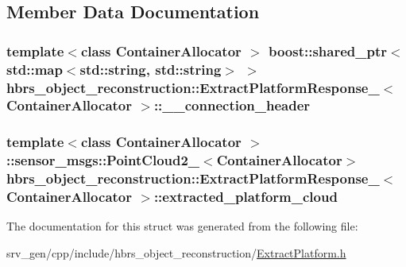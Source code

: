\subsection{\-Member \-Data \-Documentation}
\hypertarget{structhbrs__object__reconstruction_1_1_extract_platform_response___a2f07573bdee38c36a10d7880923dc5f6}{
\subsubsection[{\-\_\-\-\_\-connection\-\_\-header}]{\setlength{\rightskip}{0pt plus 5cm}template$<$class Container\-Allocator $>$ boost\-::shared\-\_\-ptr$<$std\-::map$<$std\-::string, std\-::string$>$ $>$ {\bf hbrs\-\_\-object\-\_\-reconstruction\-::\-Extract\-Platform\-Response\-\_\-}$<$ \-Container\-Allocator $>$\-::{\bf \-\_\-\-\_\-connection\-\_\-header}}}\label{structhbrs__object__reconstruction_1_1_extract_platform_response___a2f07573bdee38c36a10d7880923dc5f6}
\hypertarget{structhbrs__object__reconstruction_1_1_extract_platform_response___a4a381bfcb814115a2c0cbeff6f16dbf3}{
\subsubsection[{extracted\-\_\-platform\-\_\-cloud}]{\setlength{\rightskip}{0pt plus 5cm}template$<$class Container\-Allocator $>$ \-::sensor\-\_\-msgs\-::\-Point\-Cloud2\-\_\-$<$\-Container\-Allocator$>$ {\bf hbrs\-\_\-object\-\_\-reconstruction\-::\-Extract\-Platform\-Response\-\_\-}$<$ \-Container\-Allocator $>$\-::{\bf extracted\-\_\-platform\-\_\-cloud}}}\label{structhbrs__object__reconstruction_1_1_extract_platform_response___a4a381bfcb814115a2c0cbeff6f16dbf3}


\-The documentation for this struct was generated from the following file\-:\begin{DoxyCompactItemize}
\item 
srv\-\_\-gen/cpp/include/hbrs\-\_\-object\-\_\-reconstruction/\hyperlink{_extract_platform_8h}{\-Extract\-Platform.\-h}\end{DoxyCompactItemize}
